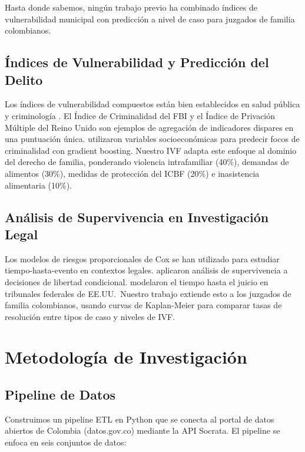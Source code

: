 \documentclass[runningheads]{llncs}
\begin{document}
Hasta donde sabemos, ning\'{u}n trabajo previo ha combinado \'indices de vulnerabilidad municipal con predicci\'{o}n a nivel de caso para juzgados de familia colombianos.

\subsection{\'Indices de Vulnerabilidad y Predicci\'{o}n del Delito}

Los \'indices de vulnerabilidad compuestos est\'{a}n bien establecidos en salud p\'{u}blica \cite{florida2020social} y criminolog\'{i}a \cite{shaw1942social}. El \'Indice de Criminalidad del FBI y el \'Indice de Privaci\'{o}n M\'{u}ltiple del Reino Unido son ejemplos de agregaci\'{o}n de indicadores dispares en una puntuaci\'{o}n \'unica. \cite{wang2022crime} utilizaron variables socioecon\'{o}micas para predecir focos de criminalidad con gradient boosting. Nuestro IVF adapta este enfoque al dominio del derecho de familia, ponderando violencia intrafamiliar (40\%), demandas de alimentos (30\%), medidas de protecci\'{o}n del ICBF (20\%) e inasistencia alimentaria (10\%).

\subsection{An\'{a}lisis de Supervivencia en Investigaci\'{o}n Legal}

Los modelos de riesgos proporcionales de Cox se han utilizado para estudiar tiempo-hasta-evento en contextos legales. \cite{spohn2002sentencing} aplicaron an\'{a}lisis de supervivencia a decisiones de libertad condicional. \cite{ulmer2018trial} modelaron el tiempo hasta el juicio en tribunales federales de EE.UU.\ Nuestro trabajo extiende esto a los juzgados de familia colombianos, usando curvas de Kaplan-Meier para comparar tasas de resoluci\'{o}n entre tipos de caso y niveles de IVF.

\section{Metodolog\'{i}a de Investigaci\'{o}n}

\subsection{Pipeline de Datos}

Construimos un pipeline ETL en Python que se conecta al portal de datos abiertos de Colombia (datos.gov.co) mediante la API Socrata. El pipeline se enfoca en seis conjuntos de datos:
\end{document}
